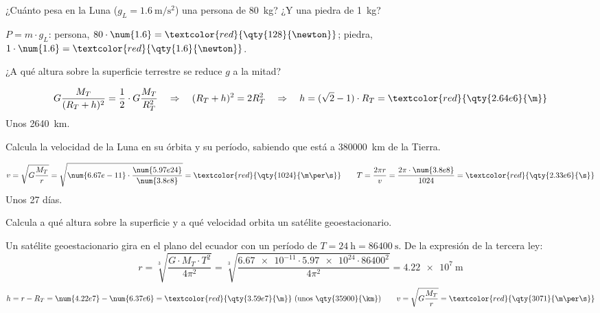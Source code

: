 \begin{exercise}
    ¿Cuánto pesa en la Luna (\(g_L = \qty{1.6}{\m\per\square\s}\)) una persona de \qty{80}{\kg}? ¿Y una piedra de \qty{1}{\kg}?
    \begin{solu}
        \(P = m \cdot g_L\): persona, \(80 \cdot \num{1.6} = \textcolor{red}{\qty{128}{\newton}}\); piedra, \(1 \cdot \num{1.6} = \textcolor{red}{\qty{1.6}{\newton}}\).
    \end{solu}
\end{exercise}

\begin{exercise}
    ¿A qué altura sobre la superficie terrestre se reduce \(g\) a la mitad?
    \begin{solu}
        \[ G \frac{M_T}{(R_T + h)^2} = \frac{1}{2} \cdot G \frac{M_T}{R_T^2} \quad\Rightarrow\quad (R_T + h)^2 = 2R_T^2 \quad\Rightarrow\quad h = (\sqrt{2} - 1) \cdot R_T = \textcolor{red}{\qty{2.64e6}{\m}} \]
        Unos \qty{2640}{\km}.
    \end{solu}
\end{exercise}

\begin{exercise}
    Calcula la velocidad de la Luna en su órbita y su período, sabiendo que está a \qty{380000}{\km} de la Tierra.
    \begin{solu}
        \[ v = \sqrt{G \frac{M_T}{r}} = \sqrt{\num{6.67e-11} \cdot \frac{\num{5.97e24}}{\num{3.8e8}}} = \textcolor{red}{\qty{1024}{\m\per\s}} \qquad T = \frac{2\pi r}{v} = \frac{2\pi \cdot \num{3.8e8}}{1024} = \textcolor{red}{\qty{2.33e6}{\s}} \]
        Unos 27 días.
    \end{solu}
\end{exercise}

\begin{exercise}
    Calcula a qué altura sobre la superficie y a qué velocidad orbita un satélite geoestacionario.
    \begin{solu}
        Un satélite geoestacionario gira en el plano del ecuador con un período de \(T = \qty{24}{\hour} = \qty{86400}{\s}\). De la expresión de la tercera ley:
        \[ r = \sqrt[3]{\frac{G \cdot M_T \cdot T^2}{4\pi^2}} = \sqrt[3]{\frac{\num{6.67e-11} \cdot \num{5.97e24} \cdot 86400^2}{4\pi^2}} = \qty{4.22e7}{\m} \]
        \[ h = r - R_T = \num{4.22e7} - \num{6.37e6} = \textcolor{red}{\qty{3.59e7}{\m}} \ (\text{unos } \qty{35900}{\km}) \qquad v = \sqrt{G \frac{M_T}{r}} = \textcolor{red}{\qty{3071}{\m\per\s}} \]
    \end{solu}
\end{exercise}

